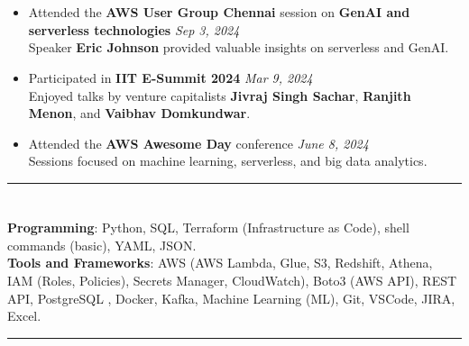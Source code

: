 \documentclass[a4paper,10pt]{article}
\begin{document}
\section{\scshape\color{Fuchsia}{\faUsers \ \textbf SEMINARS \& CONFERENCES}}
\begin{itemize}
    \item Attended the \textbf{AWS User Group Chennai} session on \textbf{GenAI and serverless technologies} \href{https://www.linkedin.com/posts/a-shreehari_awsusergroupchennai-aws-serverless-activity-7238775038324129792-rlYK?utm_source=share&utm_medium=member_desktop}{} \hfill \textit{Sep 3, 2024} \\ 
    Speaker \textbf{Eric Johnson} provided valuable insights on serverless and GenAI.
    \vspace{-2mm}
    \item Participated in \textbf{IIT E-Summit 2024} \href{https://www.linkedin.com/posts/jayasri-anbazhagan-514684265_iitm-e-activity-7174416598450020352-jMtA?utm_source=share&utm_medium=member_desktop}{} \hfill \textit{Mar 9, 2024} \\ 
    Enjoyed talks by venture capitalists \textbf{Jivraj Singh Sachar}, \textbf{Ranjith Menon}, and \textbf{Vaibhav Domkundwar}.
    \vspace{-2mm}
    \item Attended the \textbf{AWS Awesome Day} conference \href{https://www.linkedin.com/posts/activity-7077135676516798464-hqoG?utm_source=share&utm_medium=member_desktop}{} \hfill \textit{June 8, 2024} \\ 
    Sessions focused on machine learning, serverless, and big data analytics.
\end{itemize}

\hrule
\section{\scshape\color{Fuchsia}{\faTools\ \textbf TECHNICAL SKILLS}}
\textbf{Programming}: Python, SQL, Terraform (Infrastructure as Code), shell commands (basic), YAML, JSON. \\
\textbf{Tools and Frameworks}: AWS (AWS Lambda, Glue, S3, Redshift, Athena, IAM (Roles, Policies), Secrets Manager, CloudWatch), Boto3 (AWS API), REST API, PostgreSQL
, Docker, Kafka, Machine Learning (ML), Git, VSCode, JIRA, Excel.
\vspace{3mm}

\hrule
\end{document}
